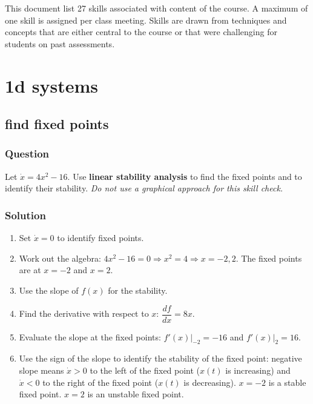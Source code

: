 \documentclass[12pt,letterpaper,noanswers]{exam}
\begin{document}
 \pdfpageheight 11in 
  \pdfpagewidth 8.5in

This document list 27 skills associated with content of the course.  A maximum of one skill is assigned per class meeting.  Skills are drawn from techniques and concepts that are either central to the course or that were challenging for students on past assessments.

\tableofcontents
  
\section{1d systems}
\subsection{find fixed points}
\subsubsection{Question}

 Let $\displaystyle\dot{x} = 4x^2 - 16$.  Use \textbf{linear stability analysis} to find the fixed points and to identify their stability.  \emph{Do not use a graphical approach for this skill check.} %

\subsubsection{Solution}
\begin{enumerate}
\itemsep-0.3em
    \item Set $\dot{x} = 0$ to identify fixed points.
    \item Work out the algebra: $4x^2 - 16 = 0 \Rightarrow x^2 = 4 \Rightarrow x = -2, 2$.  The fixed points are at $x = -2$ and $x = 2$.
    \item Use the slope of $f(x)$ for the stability.  
    \item Find the derivative with respect to $x$: $\dfrac{df}{dx} = 8x$.
    \item Evaluate the slope at the fixed points: $\left.f'(x)\right\vert_{-2} = -16$ and $\left.f'(x)\right\vert_{2} = 16$.
    \item Use the sign of the slope to identify the stability of the fixed point: negative slope means $\dot x > 0$ to the left of the fixed point ($x(t)$ is increasing) and $\dot x < 0$ to the right of the fixed point ($x(t)$ is decreasing).  $x = -2$ is a stable fixed point.  $x = 2$ is an unstable fixed point.
\end{enumerate}
\end{document}
